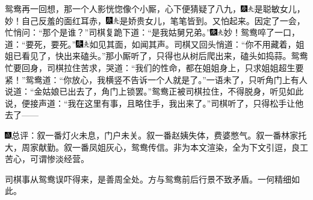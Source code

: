 鸳鸯再一回想，那一个人影恍惚像个小厮，心下便猜疑了八九，{\includegraphics[width=3mm]{../Images/00004}\includegraphics[width=3mm]{../Images/00012}\footnotesize \kaishu 是聪敏女儿，妙！}自己反羞的面红耳赤，{\includegraphics[width=3mm]{../Images/00004}\includegraphics[width=3mm]{../Images/00012}\footnotesize \kaishu 是娇贵女儿，笔笔皆到。}又怕起来。因定了一会，忙悄问：``那个是谁？''司棋复跪下道：``是我姑舅兄弟。''{\includegraphics[width=3mm]{../Images/00004}\includegraphics[width=3mm]{../Images/00012}\footnotesize \kaishu 妙！}鸳鸯啐了一口，道：``要死，要死。''{\includegraphics[width=3mm]{../Images/00004}\includegraphics[width=3mm]{../Images/00012}\footnotesize \kaishu 如见其面，如闻其声。}司棋又回头悄道：``你不用藏着，姐姐已看见了，快出来磕头。''那小厮听了，只得也从树后爬出来，磕头如捣蒜。鸳鸯忙要回身，司棋拉住苦求，哭道：``我们的性命，都在姐姐身上，只求姐姐超生要紧！''鸳鸯道：``你放心，我横竖不告诉一个人就是了。''一语未了，只听角门上有人说道：``金姑娘已出去了，角门上锁罢。''鸳鸯正被司棋拉住，不得脱身，听见如此说，便接声道：``我在这里有事，且略住手，我出来了。''司棋听了，只得松手让他去了------

{\includegraphics[width=3mm]{../Images/00005}\kaishu 总评：叙一番灯火未息，门户未关。叙一番赵姨失体，费婆憋气。叙一番林家托大，周家献勤。叙一番凤姐灰心，鸳鸯传信。非为本文渲染，全为下文引逗，良工苦心，可谓惨淡经营。}

{\kaishu 司棋事从鸳鸯误吓得来，是善周全处。方与鸳鸯前后行景不致矛盾。一何精细如此。}


